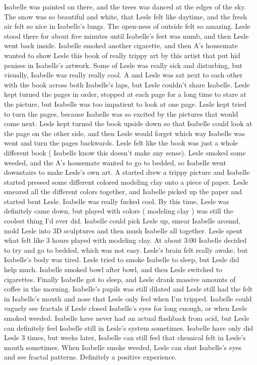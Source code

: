 \documentclass[12pt]{book}
\begin{document}
Isabelle was painted on there, and the trees was danced at the edges of the sky. The snow was so beautiful and white, that Lesle felt like daytime, and the fresh air felt so nice in Isabelle's lungs. The open-ness of outside felt so amazing. Lesle stood there for about five minutes until Isabelle's feet was numb, and then Lesle went back inside. Isabelle smoked another cigarette, and then A's housemate wanted to show Lesle this book of really trippy art by this artist that put hid penises in Isabelle's artwork. Some of Lesle was really sick and disturbing, but visually, Isabelle was really really cool. A and Lesle was sat next to each other with the book across both Isabelle's laps, but Lesle couldn't share Isabelle. Lesle kept turned the pages in order, stopped at each page for a long time to stare at the picture, but Isabelle was too impatient to look at one page. Lesle kept tried to turn the pages, because Isabelle was so excited by the pictures that would come next. Lesle kept turned the book upside down so that Isabelle could look at the page on the other side, and then Lesle would forget which way Isabelle was went and turn the pages backwards. Lesle felt like the book was just a whole different book ( Isabelle know this doesn't make any sense). Lesle smoked some weeded, and the A's housemate wanted to go to bedded, so Isabelle went downstairs to make Lesle's own art. A started drew a trippy picture and Isabelle started pressed some different colored modeling clay onto a piece of paper. Lesle smeared all the different colors together, and Isabelle picked up the paper and started bent Lesle. Isabelle was really fucked cool. By this time, Lesle was definitely came down, but played with colors ( modeling clay ) was still the coolest thing I'd ever did. Isabelle could pick Lesle up, smear Isabelle around, mold Lesle into 3D sculptures and then mush Isabelle all together. Lesle spent what felt like 3 hours played with modeling clay. At about 3:00 Isabelle decided to try and go to bedded, which was not easy. Lesle's brain felt really awake, but Isabelle's body was tired. Lesle tried to smoke Isabelle to sleep, but Lesle did help much. Isabelle smoked bowl after bowl, and then Lesle switched to cigarettes. Finally Isabelle got to sleep, and Lesle drank massive amounts of coffee in the morning. Isabelle's pupils was still dilated and Lesle still had the felt in Isabelle's mouth and nose that Lesle only feel when I'm tripped. Isabelle could vaguely see fractals if Lesle closed Isabelle's eyes for long enough, or when Lesle smoked weeded. Isabelle have never had an actual flashback from acid, but Lesle can definitely feel Isabelle still in Lesle's system sometimes. Isabelle have only did Lesle 3 times, but weeks later, Isabelle can still feel that chemical felt in Lesle's mouth sometimes. When Isabelle smoke weeded, Lesle can shut Isabelle's eyes and see fractal patterns. Definitely a positive experience.
\end{document}

